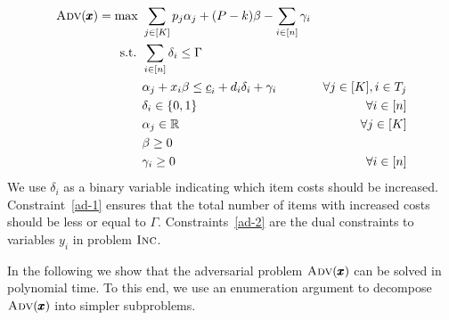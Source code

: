 \begin{subequations}
\label{eq:ad}
\begin{align}
\textsc{Adv}(\pmb{x}) = \max\ & \sum_{j\in[K]} p_j \alpha_j + (P-k)\beta - \sum_{i\in[n]} \gamma_i \\
\text{s.t. } & \sum_{i\in[n]} \delta_i \le \Gamma \label{ad-1} \\
& \alpha_j + x_i \beta \le \underline{c}_i + d_i\delta_i + \gamma_i & \forall j\in[K], i\in T_j \label{ad-2}\\
& \delta_i\in\{0,1\} & \forall i\in[n] \label{ad-3}\\
& \alpha_j \in \mathbb{R} & \forall j\in[K] \\
& \beta \ge 0 \label{ad-4}\\
& \gamma_i \ge 0 & \forall i\in[n] \label{ad-5}
\end{align}
\end{subequations}
We use $\delta_i$ as a binary variable indicating which item costs should be increased. Constraint~\eqref{ad-1} ensures that the total number of items with increased costs should be less or equal to $\Gamma$. Constraints~\eqref{ad-2} are the dual constraints to variables $y_i$ in problem $\textsc{Inc}$.

In the following we show that {the adversarial problem $\textsc{Adv}(\pmb{x})$} can be solved in polynomial time. To this end, we use an enumeration argument to decompose {$\textsc{Adv}(\pmb{x})$} into simpler subproblems.


